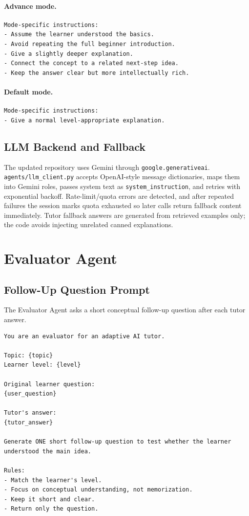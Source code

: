 \documentclass[11pt,a4paper]{article}
\begin{document}
\paragraph{Advance mode.}
\begin{lstlisting}
Mode-specific instructions:
- Assume the learner understood the basics.
- Avoid repeating the full beginner introduction.
- Give a slightly deeper explanation.
- Connect the concept to a related next-step idea.
- Keep the answer clear but more intellectually rich.
\end{lstlisting}

\paragraph{Default mode.}
\begin{lstlisting}
Mode-specific instructions:
- Give a normal level-appropriate explanation.
\end{lstlisting}

\subsection{LLM Backend and Fallback}

The updated repository uses Gemini through \texttt{google.generativeai}. \texttt{agents/llm\_client.py} accepts OpenAI-style message dictionaries, maps them into Gemini roles, passes system text as \texttt{system\_instruction}, and retries with exponential backoff. Rate-limit/quota errors are detected, and after repeated failures the session marks quota exhausted so later calls return fallback content immediately. Tutor fallback answers are generated from retrieved examples only; the code avoids injecting unrelated canned explanations.

\section{Evaluator Agent}

\subsection{Follow-Up Question Prompt}

The Evaluator Agent asks a short conceptual follow-up question after each tutor answer.

\begin{lstlisting}
You are an evaluator for an adaptive AI tutor.

Topic: {topic}
Learner level: {level}

Original learner question:
{user_question}

Tutor's answer:
{tutor_answer}

Generate ONE short follow-up question to test whether the learner understood the main idea.

Rules:
- Match the learner's level.
- Focus on conceptual understanding, not memorization.
- Keep it short and clear.
- Return only the question.
\end{lstlisting}
\end{document}
